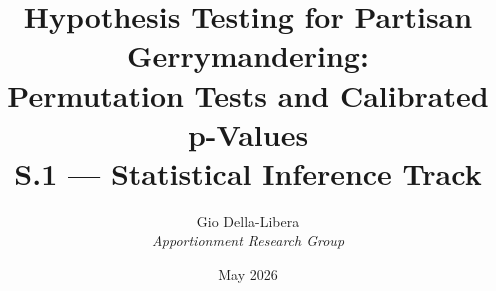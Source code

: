 \documentclass[12pt]{article}
\title{\textbf{Hypothesis Testing for Partisan Gerrymandering:\\
Permutation Tests and Calibrated p-Values}\\[0.4em]
\large S.1 --- Statistical Inference Track}
\author{Gio Della-Libera \\ \textit{Apportionment Research Group}}
\date{May 2026}
\begin{document}
\maketitle
\begin{abstract}\end{abstract}






\end{document}
